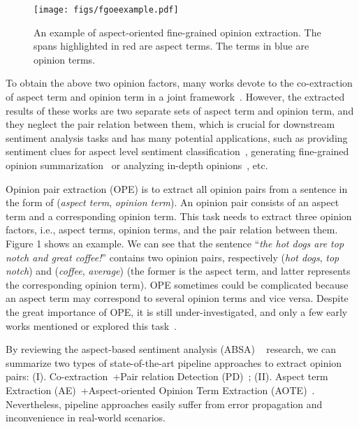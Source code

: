\documentclass[11pt,a4paper]{article}
\begin{document}
\begin{figure}[t]
	\centering
	\texttt{[image: figs/fgoeexample.pdf]}
	\caption{An example of aspect-oriented fine-grained opinion extraction. The spans highlighted in red are aspect terms. The terms in blue are opinion terms.}
	\label{opeexample}
\end{figure}

To obtain the above two opinion factors, many works devote to the co-extraction of aspect term and opinion term in a joint framework~\cite{DBLP:conf/emnlp/WangPDX16,DBLP:conf/aaai/WangPDX17,DBLP:conf/emnlp/LiL17,DBLP:journals/taslp/YuJX19,DBLP:conf/acl/DaiS19}. However, the extracted results of these works are two separate sets of aspect term and opinion term, and they neglect the pair relation between them, which is crucial for downstream sentiment analysis tasks and has many potential applications, such as providing sentiment clues for aspect level sentiment classification~\cite{DBLP:conf/semeval/PontikiGPPAM14}, generating fine-grained opinion summarization~\cite{DBLP:conf/cikm/ZhuangJZ06} or analyzing in-depth opinions~\cite{DBLP:conf/emnlp/KobayashiIM07}, etc. 

Opinion pair extraction (OPE) is to extract all opinion pairs from a sentence in the form of (\emph{aspect term}, \emph{opinion term}). An opinion pair consists of an aspect term and a corresponding opinion term. This task needs to extract three opinion factors, i.e., aspect terms, opinion terms, and the pair relation between them. Figure 1 shows an example. We can see that the sentence ``\emph{the hot dogs are top notch and great coffee!}'' contains two opinion pairs, respectively (\emph{hot dogs}, \emph{top notch}) and (\emph{coffee}, \emph{average}) (the former is the aspect term, and latter represents the corresponding opinion term). OPE sometimes could be complicated because an aspect term may correspond to several opinion terms and vice versa. Despite the great importance of OPE, it is still under-investigated, and only a few early works mentioned or explored this task~\cite{DBLP:conf/kdd/HuL04,DBLP:conf/cikm/ZhuangJZ06,DBLP:conf/icdm/KlingerC13,DBLP:conf/acl/YangC13}.





By reviewing the aspect-based sentiment analysis (ABSA) ~\cite{DBLP:conf/semeval/PontikiGPPAM14} research, we can summarize two types of state-of-the-art pipeline approaches to extract opinion pairs: (I). Co-extraction~\cite{DBLP:conf/aaai/WangPDX17,DBLP:conf/acl/DaiS19}+Pair relation Detection (PD)~\cite{DBLP:conf/acl/XuLSY18}; (II). Aspect term Extraction (AE)~\cite{DBLP:conf/acl/XuLSY18}+Aspect-oriented Opinion Term Extraction (AOTE)~\cite{DBLP:conf/naacl/FanWDHC19}. Nevertheless, pipeline approaches easily suffer from error propagation and inconvenience in real-world scenarios. 
\end{document}

